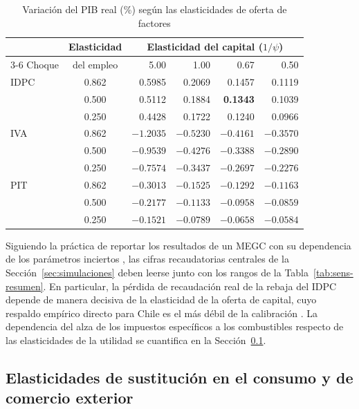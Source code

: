 \documentclass[11pt]{article}
\begin{document}
\begin{table}[H]
\centering
\caption{Variación del PIB real (\%) según las elasticidades de oferta de factores}
\label{tab:sens-pib}
\small
\begin{tabular}{|l|c|r|r|r|r|}
  \hline
  & Elasticidad & \multicolumn{4}{c|}{Elasticidad del capital ($1/\psi$)} \\
  \cline{3-6}
  Choque & del empleo & 5.00 & 1.00 & 0.67 & 0.50 \\
  \hline
  IDPC & 0.862 & 0.5985 & 0.2069 & 0.1457 & 0.1119 \\
  & 0.500 & 0.5112 & 0.1884 & \textbf{0.1343} & 0.1039 \\
  & 0.250 & 0.4428 & 0.1722 & 0.1240 & 0.0966 \\
  \hline
  IVA & 0.862 & $-1.2035$ & $-0.5230$ & $-0.4161$ & $-0.3570$ \\
  & 0.500 & $-0.9539$ & $-0.4276$ & $\mathbf{-0.3388}$ & $-0.2890$ \\
  & 0.250 & $-0.7574$ & $-0.3437$ & $-0.2697$ & $-0.2276$ \\
  \hline
  PIT & 0.862 & $-0.3013$ & $-0.1525$ & $-0.1292$ & $-0.1163$ \\
  & 0.500 & $-0.2177$ & $-0.1133$ & $\mathbf{-0.0958}$ & $-0.0859$ \\
  & 0.250 & $-0.1521$ & $-0.0789$ & $-0.0658$ & $-0.0584$ \\
  \hline
\end{tabular}
\end{table}

Siguiendo la práctica de reportar los resultados de un MEGC con su dependencia de los parámetros inciertos \cite{dixon_rimmer_2013}, las cifras recaudatorias centrales de la Sección~\ref{sec:simulaciones} deben leerse junto con los rangos de la Tabla~\ref{tab:sens-resumen}. En particular, la pérdida de recaudación real de la rebaja del IDPC depende de manera decisiva de la elasticidad de la oferta de capital, cuyo respaldo empírico directo para Chile es el más débil de la calibración \cite{hassett_hubbard_2002,cerda_larrain_2005}. La dependencia del alza de los impuestos específicos a los combustibles respecto de las elasticidades de la utilidad se cuantifica en la Sección~\ref{sec:sens-consumo-comercio}.

\subsection{Elasticidades de sustitución en el consumo y de comercio exterior}
\label{sec:sens-consumo-comercio}
\end{document}
